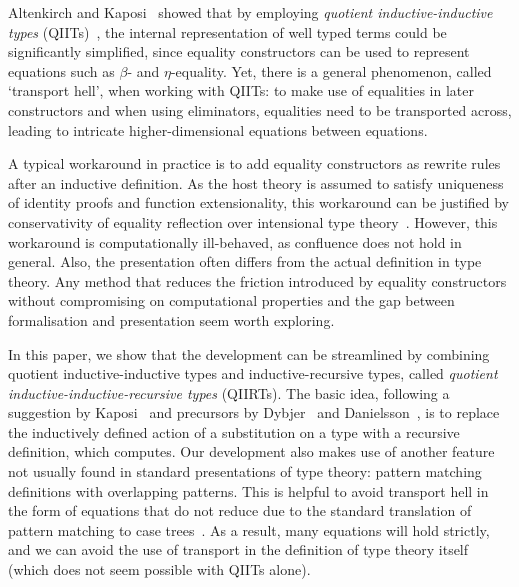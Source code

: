 \documentclass[a4paper,UKenglish,numberwithinsect,cleveref,thm-restate]{lipics-v2021}
\begin{document}
Altenkirch and Kaposi~\cite{Altenkirch2016a} showed that by employing \emph{quotient inductive-inductive types} (QIITs)~\cite{Altenkirch2018}, the internal representation of well typed terms could be significantly simplified, since equality constructors can be used to represent equations such as $\beta$- and $\eta$-equality.
%
Yet, there is a general phenomenon, called `transport hell', when working with QIITs: to make use of equalities in later constructors and when using eliminators, equalities need to be transported across,
leading to intricate higher-dimensional equations between equations.

A typical workaround in practice \cite{Kaposi2019,Kaposi2024a} is to add equality constructors as rewrite rules~\cite{Cockx2021,Cockx2020} after an inductive definition.
%
As the host theory is assumed to satisfy uniqueness of identity proofs and function extensionality, this workaround can be justified by conservativity of equality reflection over intensional type theory~\cite{Hofmann1996,Winterhalter2019,Kapulkin2025}.
%
However, this workaround is computationally ill-behaved, as confluence does not hold in general.
Also, the presentation often differs from the actual definition in type theory.
%
Any method that reduces the friction introduced by equality constructors without compromising on computational properties and the gap between formalisation and presentation seem worth exploring.
%

In this paper, we show that the development can be streamlined by combining quotient inductive-inductive types and inductive-recursive types, called \emph{quotient inductive-inductive-recursive types} (QIIRTs).
%
The basic idea, following a suggestion by Kaposi~\cite{Kaposi2023} and precursors by Dybjer~\cite{Dybjer1996} and Danielsson~\cite{Danielsson2006}, is to replace the inductively defined action of a substitution on a type with a recursive definition, which computes.
%
Our development also makes use of another feature not usually found in standard presentations of type theory: pattern matching definitions with overlapping patterns.
%
This is helpful to avoid transport hell in the form of equations that do not reduce due to the standard translation of pattern matching to case trees~\cite{Cockx2017}.
%
As a result, many equations will hold strictly, and we can avoid the use of transport in the definition of type theory itself (which does not seem possible with QIITs alone).
%
\end{document}
